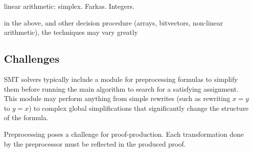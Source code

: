 \documentclass{llncs}
\newcommand{\Note}[1]{\textcolor{blue}{[#1]}}
\begin{document}
linear arithmetic: simplex.  Farkas.  Integers.

in the above, and other decision procedure (arrays, bitvectors, non-linear arithmetic), the techniques may vary greatly












\subsection{Challenges}

SMT solvers typically include a module for preprocessing formulas to simplify
them before running the main algorithm to search for a satisfying assignment.
This module may perform anything from simple rewrites (such as rewriting $x=y$
to $y=x$) to complex global simplifications that significantly change the
structure of the formula.

Preprocessing poses a challenge for proof-production.  Each transformation done
by the preprocessor must be reflected in the produced proof.
\end{document}
